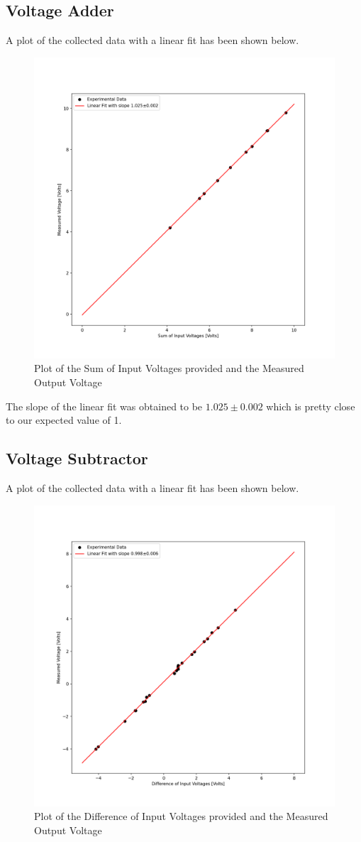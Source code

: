 \documentclass[10pt]{scrartcl}
\theoremstyle{definition}
\begin{document}
\subsection{Voltage Adder}
A plot of the collected data with a linear fit has been shown below.

\begin{figure}[!h]
    \centering
    \includegraphics[width=0.7\linewidth]{adder_plot.png}
    \caption{Plot of the Sum of Input Voltages provided and the Measured Output Voltage}
\end{figure}

The slope of the linear fit was obtained to be $1.025 \pm 0.002$ which is pretty close to our expected
value of 1.
\clearpage
\subsection{Voltage Subtractor}
A plot of the collected data with a linear fit has been shown below.

\begin{figure}[!h]
    \centering
    \includegraphics[width=0.7\linewidth]{subtractor_plot.png}
    \caption{Plot of the Difference of Input Voltages provided and the Measured Output Voltage}
\end{figure}
\end{document}
